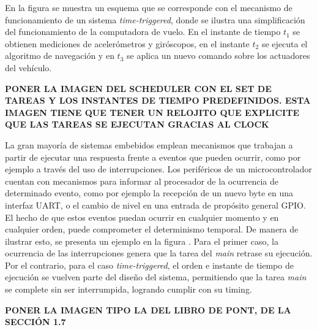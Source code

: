 En la figura  se muestra un esquema que se corresponde con el mecanismo de funcionamiento de un sistema \textit{time-triggered}, donde se ilustra una simplificación del funcionamiento de la computadora de vuelo. En el instante de tiempo $t_1$ se obtienen mediciones de acelerómetros y giróscopos, en el instante $t_2$ se ejecuta el algoritmo de navegación y en $t_3$ se aplica un nuevo comando sobre los actuadores del vehículo.

{\Large \textbf{{\color{red} PONER LA IMAGEN DEL SCHEDULER CON EL SET DE TAREAS Y LOS INSTANTES DE TIEMPO PREDEFINIDOS. ESTA IMAGEN TIENE QUE TENER UN RELOJITO QUE EXPLICITE QUE LAS TAREAS SE EJECUTAN GRACIAS AL CLOCK}}}


La gran mayoría de sistemas embebidos emplean mecanismos que trabajan a partir de ejecutar una respuesta frente a eventos que pueden ocurrir, como por ejemplo a través del uso de interrupciones. Los periféricos de un microcontrolador cuentan con mecanismos para informar al procesador de la ocurrencia de determinado evento, como por ejemplo la recepción de un nuevo byte en una interfaz UART, o el cambio de nivel en una entrada de propósito general GPIO. El hecho de que estos eventos puedan ocurrir en cualquier momento y en cualquier orden, puede comprometer el determinismo temporal. De manera de ilustrar esto, se presenta un ejemplo en la figura . Para el primer caso, la ocurrencia de las interrupciones genera que la tarea del \textit{main} retrase su ejecución. Por el contrario, para el caso \textit{time-triggered}, el orden e instante de tiempo de ejecución se vuelven parte del diseño del sistema, permitiendo que la tarea \textit{main} se complete sin ser interrumpida, logrando cumplir con su timing.

{\Large \textbf{{\color{red} PONER LA IMAGEN TIPO LA DEL LIBRO DE PONT, DE LA SECCIÓN 1.7}}}




